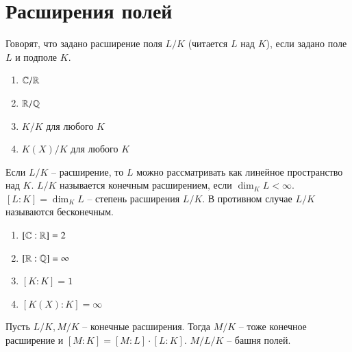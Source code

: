 \documentclass[main]{subfiles}
\begin{document}
\chapter{Расширения полей}


\begin{definition}
    Говорят, что задано расширение поля $L / K$ (читается $L$ над $K$),
     если задано поле $L$ и подполе $K$.
\end{definition}

\begin{example}
    \begin{enumerate}
        \item $\mathbb{C} / \mathbb{R}$
        \item $ \mathbb{R} / \mathbb{Q} $
        \item  $ K / K$ для любого $K$
        \item  $K(X) / K $ для любого $K$
    \end{enumerate}
  
\end{example}

Если $L / K$ -- расширение, то $L$ можно рассматривать как линейное пространство над $K$.
$L / K$ называется конечным расширением, если $\dim_K L < \infty$. 
$[L:K] = \dim_K L $ -- степень расширения $L / K$. В противном случае
$L / K$ называются бесконечным.

\begin{example}
    \begin{enumerate}
        \item $[\mathbb{C}:\mathbb{R}] = 2$
        \item $[\mathbb{R} : \mathbb{Q} ] = \infty$
        \item  $ [K:K] = 1$
        \item $[K(X):K]= \infty $ 
    \end{enumerate}
\end{example}

\begin{proposition}
    Пусть $L / K, M / K$ -- конечные расширения. Тогда $M / K$ -- тоже
    конечное расширение и $[M:K] = [M:L] \cdot [L:K]$.
    $M / L / K $ -- башня полей.
\end{proposition}
\end{document}
